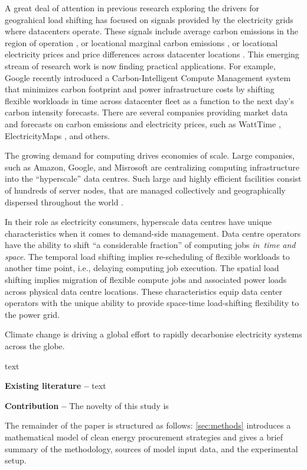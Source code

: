 A great deal of attention in previous research exploring the drivers for geograhical load shifting has focused on signals provided by the electricity grids where datacenters operate. These signals include average carbon emissions in the region of operation \cite{zhengMitigatingCurtailmentCarbon2020}, or locational marginal carbon emissions \cite{lindbergEnvironmentalPotentialHyperScale2021}, or locational electricity prices and price differences across datacenter locations \cite{raoMinimizingElectricityCost2010,tranHowGeoDistributedData2016, zhangRemuneratingSpaceTime2022}. This emerging stream of research work is now finding practical applications. For example, Google recently introduced a Carbon-Intelligent Compute Management system that minimizes carbon footprint and power infrastructure costs by shifting flexible workloads in time  across datacenter fleet as a function to the next day's carbon intensity forecasts. \cite{radovanovicIEEE2023} There are several companies providing market data and forecasts on carbon emissions and electricity prices, such as WattTime \cite{WattTime}, ElectricityMaps \cite{ElectricityMaps}, and others.

The growing demand for computing drives economies of scale. Large companies, such as Amazon, Google, and Misrosoft are centralizing computing infrastructure into the \enquote{hyperscale} data centres. 
Such large and highly efficient facilities consist of hundreds of server nodes, that are managed collectively and geographically dispersed throughout the world \cite{ThereAre500}. 

In their role as electricity consumers, hyperscale data centres have unique characteristics when it comes to demand-side management. Data centre operators have the ability to shift \enquote{a considerable fraction} of computing jobs \textit{in~time and space}. \cite{radovanovicIEEE2023} The temporal load shifting implies re-scheduling of flexible workloads to another time point, i.e., delaying computing job execution. The spatial load shifting implies migration of flexible compute jobs and associated power loads across physical data centre locations. These characteristics equip data center operators with the unique ability to provide space-time load-shifting flexibility to the power grid.

Climate change is driving a global effort to rapidly decarbonise electricity systems across the globe.

text


\textbf{Existing literature --}
text


\textbf{Contribution --} The novelty of this study is


The remainder of the paper is structured as follows: \cref{sec:methods} introduces a mathematical model of clean energy procurement strategies and gives a brief summary of the methodology, sources of model input data, and the experimental setup.
